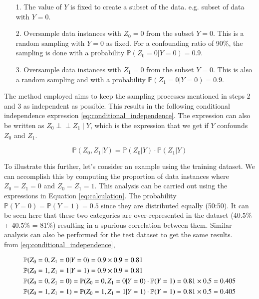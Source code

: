 \documentclass[12pt,DIV14,BCOR12mm,a4paper,footinclude=false,headinclude,parskip=half-,twoside,openright,cleardoublepage=empty,toc=index,bibliography=totoc,listof=totoc]{scrreprt}
\numberwithin{equation}{chapter}
\begin{document}
\begin{itemize}
    \item[1.] The value of $Y$ is fixed to create a subset of the data. e.g. subset of data with $Y=0$.
    \item[2.] Oversample data instances with $Z_0=0$ from the subset $Y=0$. This is a random sampling with $Y=0$ as fixed. For a confounding ratio of 90\%, the sampling is done with a probability $\mathbb{P}(Z_0=0|Y=0)=0.9$.
    \item[3.] Oversample data instances with $Z_1=0$ from the subset $Y=0$. This is also a random sampling and with a probability $\mathbb{P}(Z_1=0|Y=0)=0.9$.  
\end{itemize}

The method employed aims to keep the sampling processes mentioned in steps 2 and 3 as independent as possible. This results in the following conditional independence expression \ref{eq:conditional_independence}. The expression can also be written as $Z_0\perp\!\!\!\perp Z_1\mid Y$, which is the expression that we get if $Y$ confounds $Z_0$ and $Z_1$.

\begin{equation}
    \mathbb{P}(Z_0, Z_1 | Y) = \mathbb{P}(Z_0 | Y) \cdot \mathbb{P}(Z_1 | Y)
    \label{eq:conditional_independence}
\end{equation}

To illustrate this further, let's consider an example using the training dataset. We can accomplish this by computing the proportion of data instances where $Z_0=Z_1=0$ and $Z_0=Z_1=1$. This analysis can be carried out using the expressions in Equation \ref{eq:calculation}. The probability $\mathbb{P}(Y=0)=\mathbb{P}(Y=1)=0.5$ since they are distributed equally (50:50). It can be seen here that these two categories are over-represented in the dataset (40.5\% + 40.5\% = 81\%) resulting in a spurious correlation between them. Similar analysis can also be performed for the test dataset to get the same results.
\vspace{0.5cm}
    \\from \ref{eq:conditional_independence},

\begin{equation}\label{eq:calculation}
    \centering
    \begin{split}
        & \mathbb{P}(Z_0=0, Z_1=0| Y=0) = 0.9 \times 0.9 = 0.81\\
        & \mathbb{P}(Z_0=1, Z_1=1| Y=1) = 0.9 \times 0.9 = 0.81\\
        & \mathbb{P}(Z_0=0, Z_1=0) =\mathbb{P}(Z_0=0, Z_1=0| Y=0) \cdot \mathbb{P}(Y=1) = 0.81 \times 0.5 = 0.405\\
        & \mathbb{P}(Z_0=1, Z_1=1) = \mathbb{P}(Z_0=1, Z_1=1| Y=1) \cdot \mathbb{P}(Y=1) = 0.81 \times 0.5 = 0.405\\
    \end{split}
\end{equation}
\end{document}
